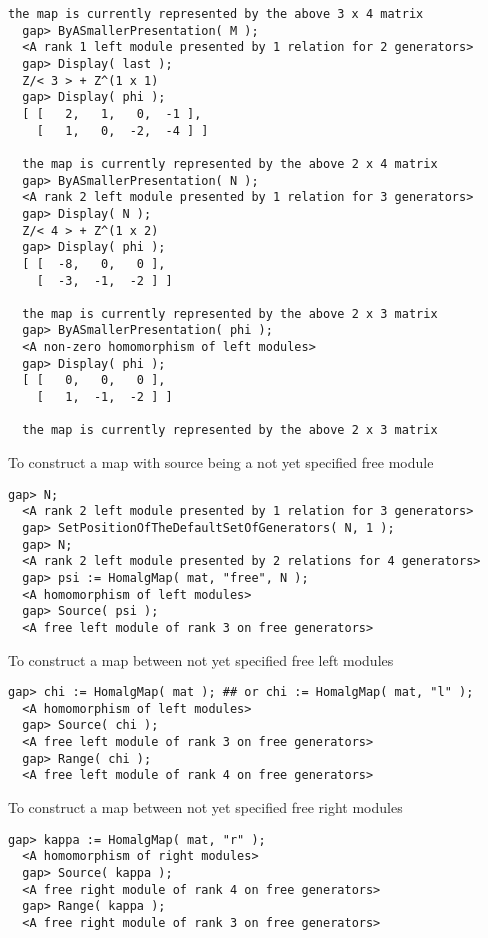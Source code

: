 \documentclass[a4paper,11pt]{report}
\begin{document}
{{{\begin{Verbatim}[fontsize=\small,frame=single,label=Example]
  the map is currently represented by the above 3 x 4 matrix
  gap> ByASmallerPresentation( M );
  <A rank 1 left module presented by 1 relation for 2 generators>
  gap> Display( last );
  Z/< 3 > + Z^(1 x 1)
  gap> Display( phi );
  [ [   2,   1,   0,  -1 ],
    [   1,   0,  -2,  -4 ] ]
  
  the map is currently represented by the above 2 x 4 matrix
  gap> ByASmallerPresentation( N );
  <A rank 2 left module presented by 1 relation for 3 generators>
  gap> Display( N );
  Z/< 4 > + Z^(1 x 2)
  gap> Display( phi );
  [ [  -8,   0,   0 ],
    [  -3,  -1,  -2 ] ]
  
  the map is currently represented by the above 2 x 3 matrix
  gap> ByASmallerPresentation( phi );
  <A non-zero homomorphism of left modules>
  gap> Display( phi );
  [ [   0,   0,   0 ],
    [   1,  -1,  -2 ] ]
  
  the map is currently represented by the above 2 x 3 matrix
\end{Verbatim}
 To construct a map with source being a not yet specified free module 
\begin{Verbatim}[fontsize=\small,frame=single,label=Example]
  gap> N;
  <A rank 2 left module presented by 1 relation for 3 generators>
  gap> SetPositionOfTheDefaultSetOfGenerators( N, 1 );
  gap> N;
  <A rank 2 left module presented by 2 relations for 4 generators>
  gap> psi := HomalgMap( mat, "free", N );
  <A homomorphism of left modules>
  gap> Source( psi );
  <A free left module of rank 3 on free generators>
\end{Verbatim}
 To construct a map between not yet specified free left modules 
\begin{Verbatim}[fontsize=\small,frame=single,label=Example]
  gap> chi := HomalgMap( mat );	## or chi := HomalgMap( mat, "l" );
  <A homomorphism of left modules>
  gap> Source( chi );
  <A free left module of rank 3 on free generators>
  gap> Range( chi );
  <A free left module of rank 4 on free generators>
\end{Verbatim}
 To construct a map between not yet specified free right modules 
\begin{Verbatim}[fontsize=\small,frame=single,label=Example]
  gap> kappa := HomalgMap( mat, "r" );
  <A homomorphism of right modules>
  gap> Source( kappa );
  <A free right module of rank 4 on free generators>
  gap> Range( kappa );
  <A free right module of rank 3 on free generators>
\end{Verbatim}
 }

 

}}
\end{document}
